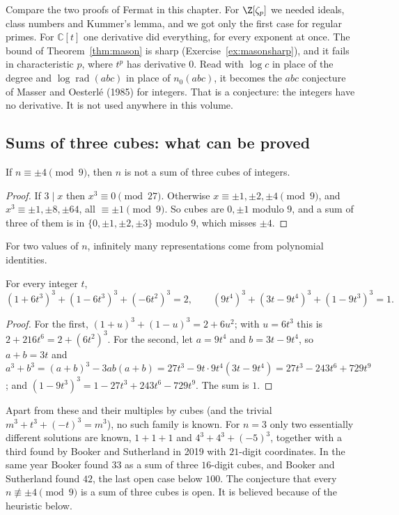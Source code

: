 Compare the two proofs of Fermat in this chapter. For $\Z[\zeta_p]$ we needed ideals, class numbers and Kummer's lemma, and we
got only the first case for regular primes. For $\mathbb C[t]$ one derivative did everything, for every exponent at once.
The bound of Theorem~\ref{thm:mason} is sharp (Exercise~\ref{ex:masonsharp}), and it fails in characteristic $p$, where
$t^p$ has derivative $0$. Read with $\log c$ in place of the degree and $\log\operatorname{rad}(abc)$ in place of $n_0(abc)$,
it becomes the $abc$ conjecture of Masser and Oesterl\'e (1985) for integers. That is a conjecture: the integers have no
derivative. It is not used anywhere in this volume.

\subsection*{Sums of three cubes: what can be proved}

\begin{proposition}\label{prop:mod9}
If $n\equiv\pm4\pmod9$, then $n$ is not a sum of three cubes of integers.
\end{proposition}
\begin{proof}
If $3\mid x$ then $x^3\equiv0\pmod{27}$. Otherwise $x\equiv\pm1,\pm2,\pm4\pmod9$, and $x^3\equiv\pm1,\pm8,\pm64$, all
$\equiv\pm1\pmod9$. So cubes are $0,\pm1$ modulo $9$, and a sum of three of them is in $\{0,\pm1,\pm2,\pm3\}$ modulo $9$, which
misses $\pm4$.
\end{proof}

For two values of $n$, infinitely many representations come from polynomial identities.

\begin{proposition}\label{prop:families}
For every integer $t$,
\[
(1+6t^3)^3+(1-6t^3)^3+(-6t^2)^3=2,\qquad(9t^4)^3+(3t-9t^4)^3+(1-9t^3)^3=1.
\]
\end{proposition}
\begin{proof}
For the first, $(1+u)^3+(1-u)^3=2+6u^2$; with $u=6t^3$ this is $2+216t^6=2+(6t^2)^3$. For the second, let $a=9t^4$ and
$b=3t-9t^4$, so $a+b=3t$ and $a^3+b^3=(a+b)^3-3ab(a+b)=27t^3-9t\cdot9t^4(3t-9t^4)=27t^3-243t^6+729t^9$; and
$(1-9t^3)^3=1-27t^3+243t^6-729t^9$. The sum is $1$.
\end{proof}

Apart from these and their multiples by cubes (and the trivial $m^3+t^3+(-t)^3=m^3$), no such family is known. For $n=3$
only two essentially different solutions are known, $1+1+1$ and $4^3+4^3+(-5)^3$, together with a third found by Booker and
Sutherland in 2019 with $21$-digit coordinates. In the same year Booker found $33$ as a sum of three $16$-digit cubes, and
Booker and Sutherland found $42$, the last open case below $100$. The conjecture that every $n\not\equiv\pm4\pmod9$ is a sum
of three cubes is open. It is believed because of the heuristic below.

